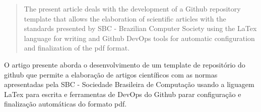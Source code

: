 \begin{abstract}
	The present article deals with the development of a Github repository template that allows the elaboration of scientific articles with the standards presented by SBC - Brazilian Computer Society using the LaTex language for writing and Github DevOps tools for automatic configuration and finalization of the pdf format.
\end{abstract}

\begin{resumo}
	O artigo presente aborda o desenvolvimento de um template de repositório do github que permite a elaboração de artigos científicos com as normas apresentadas pela SBC - Sociedade Brasileira de Computação usando a liguagem LaTex para escrita e ferramentas de DevOps do Github parar configuração e finalização automáticas do formato pdf.
\end{resumo}